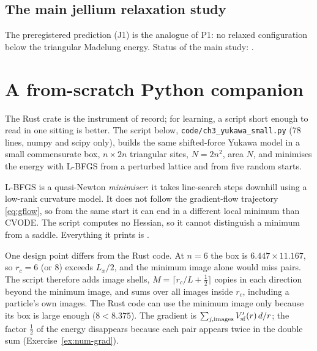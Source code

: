 \subsection{The main jellium relaxation study}
The preregistered prediction (J1) is the analogue of P1: no relaxed configuration below the triangular Madelung
energy. Status of the main study: \JelliumMainStatus.

\section{A from-scratch Python companion}\label{sec:num-python}

The Rust crate is the instrument of record; for learning, a script short enough to read in one sitting is better.
The script below, \texttt{code/ch3\_yukawa\_small.py} (78 lines, numpy and scipy only), builds the same shifted-force
Yukawa model in a small commensurate box, $n\times2n$ triangular sites, $N=2n^2$, area $N$, and minimises the energy
with L-BFGS from a perturbed lattice and from five random starts.

\begin{warnbox}
L-BFGS is a quasi-Newton \emph{minimiser}: it takes line-search steps downhill using a low-rank curvature model. It
does not follow the gradient-flow trajectory \eqref{eq:gflow}, so from the same start it can end in a different local
minimum than CVODE. The script computes no Hessian, so it cannot distinguish a minimum from a saddle. Everything
it prints is \tierX.
\end{warnbox}



One design point differs from the Rust code. At $n=6$ the box is $6.447\times11.167$, so $r_c=6$ (or $8$) exceeds
$L_x/2$, and the minimum image alone would miss pairs. The script therefore adds image shells, $M=\lceil r_c/L+\frac12\rceil$
copies in each direction beyond the minimum image, and sums over all images inside $r_c$, including a particle's own
images. The Rust code can use the minimum image only because its box is large enough ($8<8.375$). The gradient is
$\sum_{j,\text{images}}V_{\rm sf}'(r)\,d/r$; the factor $\frac12$ of the energy disappears because each pair appears twice
in the double sum (Exercise~\ref{ex:num-grad}).

